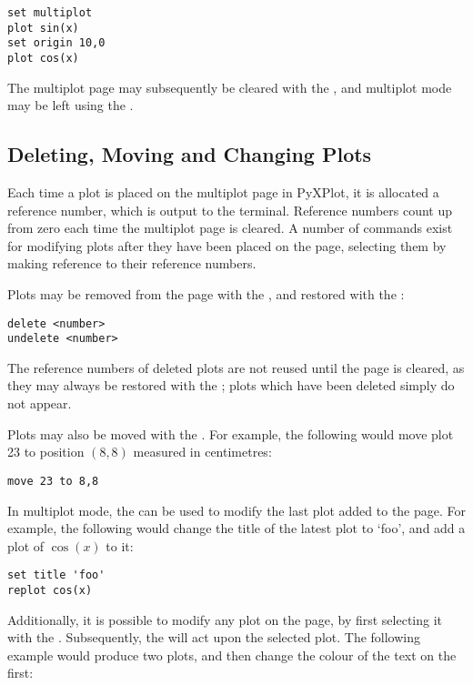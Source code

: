 \begin{verbatim} 
set multiplot
plot sin(x)
set origin 10,0
plot cos(x)
\end{verbatim}

The multiplot page may subsequently be cleared with the , and
multiplot mode may be left using the .

\subsection{Deleting, Moving and Changing Plots}

Each time a plot is placed on the multiplot page in PyXPlot, it is allocated a
reference number, which is output to the terminal. Reference numbers count up
from zero each time the multiplot page is cleared. A number of commands exist
for modifying plots after they have been placed on the page, selecting them by
making reference to their reference numbers.

Plots may be removed from the page with the , and restored with
the :

\begin{verbatim} 
delete <number>
undelete <number>
\end{verbatim}

The reference numbers of deleted plots are not reused until the page is
cleared, as they may always be restored with the ; plots
which have been deleted simply do not appear.

Plots may also be moved with the . For example, the following
would move plot 23 to position $(8,8)$ measured in centimetres:

\begin{verbatim} 
move 23 to 8,8
\end{verbatim}

In multiplot mode, the  can be used to modify the last plot
added to the page. For example, the following would change the title of the
latest plot to `foo', and add a plot of $\cos(x)$ to it:

\begin{verbatim} 
set title 'foo'
replot cos(x)
\end{verbatim}

Additionally, it is possible to modify any plot on the page, by first selecting
it with the . Subsequently, the  will act upon
the selected plot. The following example would produce two plots, and then
change the colour of the text on the first:

